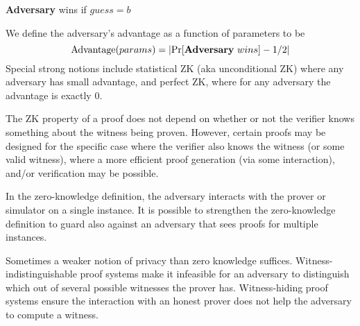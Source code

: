 \begin{bulletize}
    \item \textbf{Adversary} wins if $guess = b$
\end{bulletize}
 
We define the adversary's advantage as a function of parameters to be
$$\textmd{Advantage}(params) = | \text{Pr}[\textbf{Adversary}~ wins] - 1/2 |$$
Special strong notions include statistical ZK (aka unconditional ZK) where any adversary has small advantage, and perfect ZK, where for any adversary the advantage is exactly 0.


The ZK property of a proof does not depend on whether or not the verifier knows something about the witness being proven.
However, certain proofs may be designed for the specific case where the verifier also knows the witness (or some valid witness), where a more efficient proof generation (via some interaction), and/or verification may be possible.


In the zero-knowledge definition, the adversary interacts with the prover or simulator on a single instance. 
It is possible to strengthen the zero-knowledge definition to guard also against an adversary that sees proofs for multiple instances.
 

Sometimes a weaker notion of privacy than zero knowledge suffices. 
Witness-indistinguishable proof systems make it infeasible for an adversary to distinguish which out of several possible witnesses the prover has. Witness-hiding proof systems ensure the interaction with an honest prover does not help the adversary to compute a witness.


